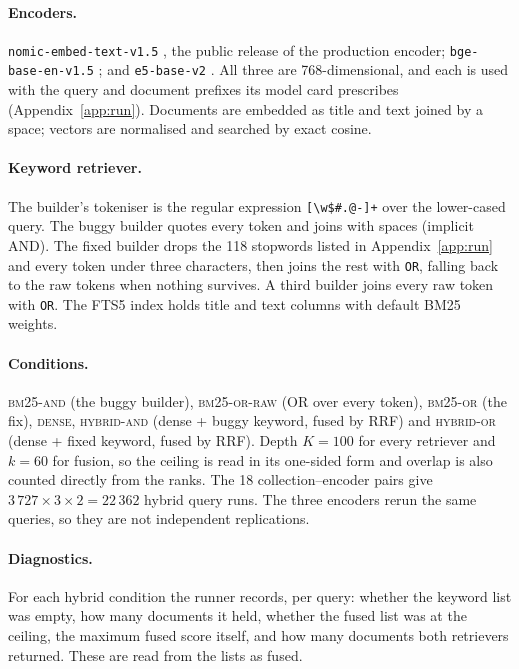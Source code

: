 \documentclass[11pt]{article}
\begin{document}
{\sloppy
\paragraph{Encoders.} \texttt{nomic-embed-text-v1.5} \citep{nussbaum2024nomic}, the public release of the production encoder; \texttt{bge-base-en-v1.5} \citep{xiao2023cpack}; and \texttt{e5-base-v2} \citep{wang2022e5}. All three are 768-dimensional, and each is used with the query and document prefixes its model card prescribes (Appendix~\ref{app:run}). Documents are embedded as title and text joined by a space; vectors are normalised and searched by exact cosine.\par}

{\sloppy
\paragraph{Keyword retriever.} The builder's tokeniser is the regular expression \verb|[\w$#.@-]+| over the lower-cased query. The buggy builder quotes every token and joins with spaces (implicit AND). The fixed builder drops the 118 stopwords listed in Appendix~\ref{app:run} and every token under three characters, then joins the rest with \verb|OR|, falling back to the raw tokens when nothing survives. A third builder joins every raw token with \verb|OR|. The FTS5 index holds title and text columns with default BM25 weights.\par}

{\sloppy
\paragraph{Conditions.} \textsc{bm25-and} (the buggy builder), \textsc{bm25-or-raw} (OR over every token), \textsc{bm25-or} (the fix), \textsc{dense}, \textsc{hybrid-and} (dense + buggy keyword, fused by RRF) and \textsc{hybrid-or} (dense + fixed keyword, fused by RRF). Depth $K = 100$ for every retriever and $k = 60$ for fusion, so the ceiling is read in its one-sided form and overlap is also counted directly from the ranks. The 18 collection--encoder pairs give $3\,727 \times 3 \times 2 = 22\,362$ hybrid query runs. The three encoders rerun the same queries, so they are not independent replications.\par}

\paragraph{Diagnostics.} For each hybrid condition the runner records, per query: whether the keyword list was empty, how many documents it held, whether the fused list was at the ceiling, the maximum fused score itself, and how many documents both retrievers returned. These are read from the lists as fused.
\end{document}
